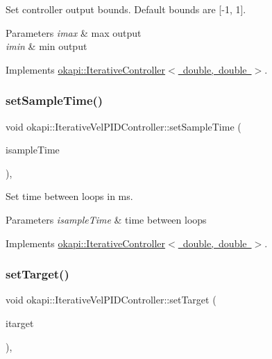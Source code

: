 Set controller output bounds. Default bounds are \mbox{[}-\/1, 1\mbox{]}.


\begin{DoxyParams}{Parameters}
{\em imax} & max output \\
\hline
{\em imin} & min output \\
\hline
\end{DoxyParams}


Implements \mbox{\hyperlink{classokapi_1_1IterativeController_ae1a7d9bd29d176a26bcc70c741f0d50f}{okapi\+::\+Iterative\+Controller$<$ double, double $>$}}.

\mbox{\label{classokapi_1_1IterativeVelPIDController_aef5ba457e81871d47519413551856bb8}} 
\subsubsection{\texorpdfstring{setSampleTime()}{setSampleTime()}}
{\footnotesize\ttfamily void okapi\+::\+Iterative\+Vel\+P\+I\+D\+Controller\+::set\+Sample\+Time (\begin{DoxyParamCaption}\item[{Q\+Time}]{isample\+Time }\end{DoxyParamCaption})\hspace{0.3cm}{\ttfamily [override]}, {\ttfamily [virtual]}}

Set time between loops in ms.


\begin{DoxyParams}{Parameters}
{\em isample\+Time} & time between loops \\
\hline
\end{DoxyParams}


Implements \mbox{\hyperlink{classokapi_1_1IterativeController_ac4cfb1b37a3c707b2fc8f2fbda526f3e}{okapi\+::\+Iterative\+Controller$<$ double, double $>$}}.

\mbox{\label{classokapi_1_1IterativeVelPIDController_ab4ec4344fa758ba8cce93633aa0851d2}} 
\subsubsection{\texorpdfstring{setTarget()}{setTarget()}}
{\footnotesize\ttfamily void okapi\+::\+Iterative\+Vel\+P\+I\+D\+Controller\+::set\+Target (\begin{DoxyParamCaption}\item[{double}]{itarget }\end{DoxyParamCaption})\hspace{0.3cm}{\ttfamily [override]}, {\ttfamily [virtual]}}

